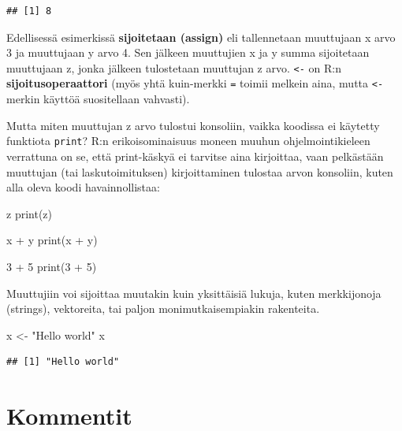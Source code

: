 \documentclass[
]{book}
\newenvironment{Shaded}{\begin{snugshade}}{\end{snugshade}}
\newcommand{\DecValTok}[1]{\textcolor[rgb]{0.00,0.00,0.81}{#1}}
\newcommand{\FunctionTok}[1]{\textcolor[rgb]{0.00,0.00,0.00}{#1}}
\newcommand{\NormalTok}[1]{#1}
\newcommand{\OtherTok}[1]{\textcolor[rgb]{0.56,0.35,0.01}{#1}}
\newcommand{\SpecialCharTok}[1]{\textcolor[rgb]{0.00,0.00,0.00}{#1}}
\newcommand{\StringTok}[1]{\textcolor[rgb]{0.31,0.60,0.02}{#1}}
\begin{document}
\begin{verbatim}
## [1] 8
\end{verbatim}

Edellisessä esimerkissä \textbf{sijoitetaan (assign)} eli tallennetaan muuttujaan x arvo 3 ja muuttujaan y arvo 4. Sen jälkeen muuttujien x ja y summa sijoitetaan muuttujaan z, jonka jälkeen tulostetaan muuttujan z arvo.
\texttt{\textless{}-} on R:n \textbf{sijoitusoperaattori} (myös yhtä kuin-merkki \texttt{=} toimii melkein aina, mutta \texttt{\textless{}-} merkin käyttöä suositellaan vahvasti).

Mutta miten muuttujan z arvo tulostui konsoliin, vaikka koodissa ei käytetty funktiota \texttt{print}? R:n erikoisominaisuus moneen muuhun ohjelmointikieleen verrattuna on se, että print-käskyä ei tarvitse aina kirjoittaa, vaan pelkästään muuttujan (tai laskutoimituksen) kirjoittaminen tulostaa arvon konsoliin, kuten alla oleva koodi havainnollistaa:

\begin{Shaded}
\begin{Highlighting}[]
\NormalTok{z}
\FunctionTok{print}\NormalTok{(z)}

\NormalTok{x }\SpecialCharTok{+}\NormalTok{ y}
\FunctionTok{print}\NormalTok{(x }\SpecialCharTok{+}\NormalTok{ y)}

\DecValTok{3} \SpecialCharTok{+} \DecValTok{5}
\FunctionTok{print}\NormalTok{(}\DecValTok{3} \SpecialCharTok{+} \DecValTok{5}\NormalTok{)}
\end{Highlighting}
\end{Shaded}

Muuttujiin voi sijoittaa muutakin kuin yksittäisiä lukuja, kuten merkkijonoja (strings), vektoreita, tai paljon monimutkaisempiakin rakenteita.

\begin{Shaded}
\begin{Highlighting}[]
\NormalTok{x }\OtherTok{\textless{}{-}} \StringTok{"Hello world"}
\NormalTok{x}
\end{Highlighting}
\end{Shaded}

\begin{verbatim}
## [1] "Hello world"
\end{verbatim}

\hypertarget{comments}{%
\section{Kommentit}\label{comments}}
\end{document}
